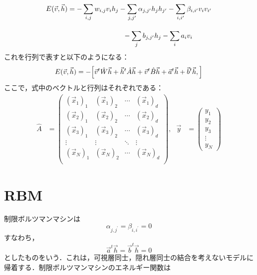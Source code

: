 \begin{align}
     E(\vec{v},\vec{h}) 
    &= -\sum_{i,j}w_{i,j} v_i h_j -\sum_{j,j^\prime} \alpha_{j,j^\prime}h_j h_{j^{\prime}}
    -\sum_{i,i^\prime} \beta_{i,i^\prime} v_i v_{i^{\prime}}\nn[10pt]
    &\hspace{80pt}-\sum_{j} b_{j,j^\prime}h_j  -\sum_{i} a_{i} v_i
\end{align}
これを行列で表すと以下のようになる：
\begin{equation}
        E(\vec{v},\vec{h}) 
        =-\Bigl[
        \Vec{v}^{t}\hat{W}\Vec{h} + \Vec{h}^{t}\hat{A}\Vec{h} + \Vec{v}^{t}\hat{B}\Vec{h}
        + \Vec{a}^{t}\Vec{h}+ \Vec{b}^{t}\Vec{h},
        \Bigr]
\end{equation}
ここで，式中のベクトルと行列はそれぞれである：
\begin{align}
    \hat{A}
    &
    =
    \left(
        \begin{array}{cccc}
       (\vec{x}_1)_1&(\vec{x}_1)_2&\cdots&(\vec{x}_1)_d\\[10pt]
       (\vec{x}_2)_1&(\vec{x}_2)_2&\cdots&(\vec{x}_2)_d\\[10pt]
       (\vec{x}_3)_1&(\vec{x}_3)_2&\cdots&(\vec{x}_3)_d\\[10pt]
       \vdots&\vdots&\ddots&\vdots\\[10pt]
       (\vec{x}_N)_1&(\vec{x}_N)_2&\cdots&(\vec{x}_N)_d\\[10pt]
        \end{array}
    \right),\ \ \ 
    \vec{y}
    &
    =\left(
        \begin{array}{c}
       {y}_1\\[5pt]
       {y}_2\\[5pt]
       {y}_3\\[5pt]
       \vdots\\[5pt]
       {y}_N
        \end{array}
    \right)
\end{align}
\section{RBM}
制限ボルツマンマシンは
\begin{equation}
    \alpha_{j,j^\prime} = \beta_{i,i^\prime} = 0
\end{equation}
すなわち，
\begin{equation}
    \Vec{a}^{t}\Vec{h} = \Vec{b}^{t}\Vec{h} = 0
\end{equation}
としたものをいう．これは，可視層同士，隠れ層同士の結合を考えないモデルに帰着する．制限ボルツマンマシンのエネルギー関数は

